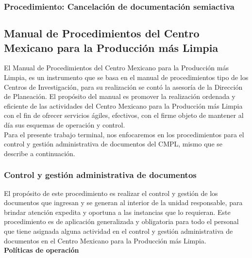 		\subsubsection{Procedimiento: Cancelación de documentación semiactiva}
	
	\subsection{Manual de Procedimientos del Centro Mexicano para la Producción más Limpia}
	El Manual de Procedimientos del Centro Mexicano para la Producción más Limpia, es un instrumento que se basa en el manual de procedimientos tipo de los Centros de Investigación, para su realización se contó la asesoría de la Dirección de Planeación. El propósito del manual es promover la realización ordenada y eficiente de las actividades del Centro Mexicano para la Producción más Limpia con el fin de ofrecer servicios ágiles, efectivos, con el firme objeto de mantener al día sus esquemas de operación y control\cite{ManProcCMPL}.\\
	
	Para el presente trabajo terminal, nos enfocaremos en los procedimientos para el control y gestión administrativa de documentos del CMPL, mismo que se describe a continuación.
	
		\subsubsection{Control y gestión administrativa de documentos}
	
	El propósito de este procedimiento es realizar el control y gestión de los documentos que ingresan y se generan al interior de la unidad responsable, para brindar atención expedita y oportuna a las instancias que lo requieran. Este procedimiento es de aplicación generalizada y obligatoria para todo el personal que tiene asignada alguna actividad en el control y gestión administrativa de documentos en el Centro Mexicano para la Producción más Limpia\cite{ControlCMPL}.\\
	
		\textbf{Políticas de operación}\\
		
